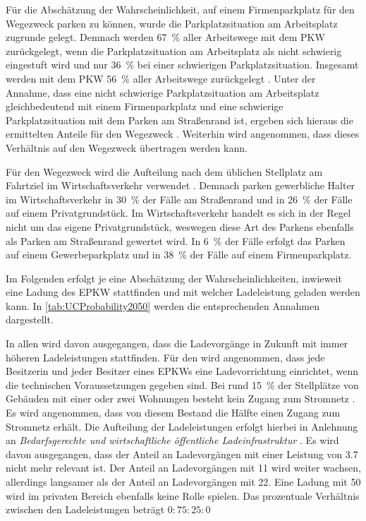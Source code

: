 Für die Abschätzung der Wahrscheinlichkeit, auf einem Firmenparkplatz für den Wegezweck \Arbeit parken zu können, wurde die Parkplatzsituation am Arbeitsplatz zugrunde gelegt.
Demnach werden \SI{67}{\percent} aller Arbeitswege mit dem \gls{PKW} zurückgelegt, wenn die Parkplatzsituation am Arbeitsplatz als nicht schwierig eingestuft wird und nur \SI{36}{\percent} bei einer schwierigen Parkplatzsituation.
Insgesamt werden mit dem \gls{PKW} \SI{56}{\percent} aller Arbeitswege zurückgelegt \cite{Ecke2020}.
Unter der Annahme, dass eine nicht schwierige Parkplatzsituation am Arbeitsplatz gleichbedeutend mit einem Firmenparkplatz und eine schwierige Parkplatzsituation mit dem Parken am Straßenrand ist, ergeben sich hieraus die ermittelten Anteile für den Wegezweck \Arbeitdot.
Weiterhin wird angenommen, dass dieses Verhältnis auf den Wegezweck \Ausbildung übertragen werden kann.\medskip

Für den Wegezweck \dienst wird die Aufteilung nach dem üblichen Stellplatz am Fahrtziel im Wirtschaftsverkehr verwendet \cite{Rikus2015}.
Demnach parken gewerbliche Halter im Wirtschaftsverkehr in \SI{30}{\percent} der Fälle am Straßenrand und in \SI{26}{\percent} der Fälle auf einem Privatgrundstück.
Im Wirtschaftsverkehr handelt es sich in der Regel nicht um das eigene Privatgrundstück, weswegen diese Art des Parkens ebenfalls als Parken am Straßenrand gewertet wird.
In \SI{6}{\percent} der Fälle erfolgt das Parken auf einem Gewerbeparkplatz und in \SI{38}{\percent} der Fälle auf einem Firmenparkplatz.\medskip

Im Folgenden erfolgt je \UC eine Abschätzung der Wahrscheinlichkeiten, inwieweit eine Ladung des \gls{EPKW} stattfinden und mit welcher Ladeleistung geladen werden kann.
In \autoref{tab:UCProbability2050} werden die entsprechenden Annahmen dargestellt.



In allen \UCs wird davon ausgegangen, dass die Ladevorgänge in Zukunft mit immer höheren Ladeleistungen stattfinden.
Für den \UC \Eigenheim wird angenommen, dass jede Besitzerin und jeder Besitzer eines \glspl{EPKW} eine Ladevorrichtung einrichtet, wenn die technischen Voraussetzungen gegeben sind.
Bei rund \SI{15}{\percent} der Stellplätze von Gebäuden mit einer oder zwei Wohnungen besteht kein Zugang zum Stromnetz \cite{dena2020}.
Es wird angenommen, dass von diesem Bestand die Hälfte einen Zugang zum Stromnetz erhält.
Die Aufteilung der Ladeleistungen erfolgt hierbei in Anlehnung an \textit{Bedarfsgerechte und wirtschaftliche öffentliche Ladeinfrastruktur} \cite{NPZMAVE2020}.
Es wird davon ausgegangen, dass der Anteil an Ladevorgängen mit einer Leistung von \SI{3.7}{\kw} nicht mehr relevant ist.
Der Anteil an Ladevorgängen mit \SI{11}{\kw} wird weiter wachsen, allerdings langsamer als der Anteil an Ladevorgängen mit \SI{22}{\kw}.
Eine Ladung mit \SI{50}{\kw} wird im privaten Bereich ebenfalls keine Rolle spielen.
Das prozentuale Verhältnis zwischen den Ladeleistungen beträgt \(0:75:25:0\)\medskip

